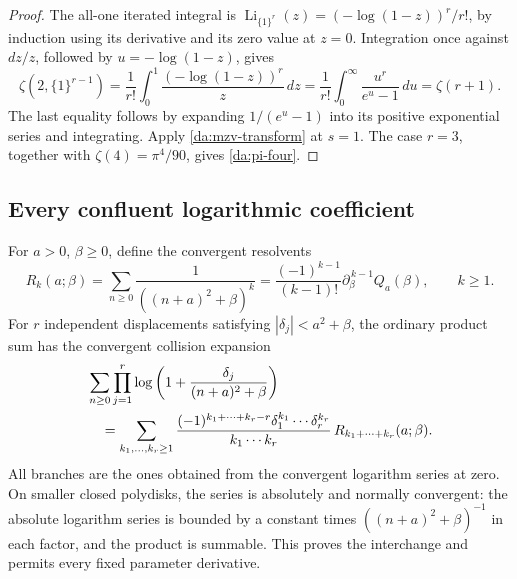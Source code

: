 \documentclass[11pt,letterpaper]{article}
\numberwithin{equation}{section}
\theoremstyle{definition}
\theoremstyle{remark}
\DeclareMathOperator{\Li}{Li}
\newcommand{\dd}{\,d}
\newcommand{\one}[1]{\{1\}^{#1}}
\begin{document}
\begin{proof}
The all-one iterated integral is
\(\Li_{\one r}(z)=(-\log(1-z))^r/r!\), by induction using its
derivative and its zero value at \(z=0\). Integration once against
\(dz/z\), followed by \(u=-\log(1-z)\), gives
\[
 \zeta(2,\one{r-1})
  =\frac1{r!}\int_0^1\frac{(-\log(1-z))^r}{z}\dd z
  =\frac1{r!}\int_0^\infty\frac{u^r}{e^u-1}\dd u
  =\zeta(r+1).
\]
The last equality follows by expanding \(1/(e^u-1)\) into its
positive exponential series and integrating. Apply
\eqref{da:mzv-transform} at \(s=1\). The case \(r=3\), together with
\(\zeta(4)=\pi^4/90\), gives \eqref{da:pi-four}.
\end{proof}

\subsection{Every confluent logarithmic coefficient}

For \(a>0\), \(\beta\ge0\), define the convergent resolvents
\[
 R_k(a;\beta)=\sum_{n\ge0}\frac1{((n+a)^2+\beta)^k}
   =\frac{(-1)^{k-1}}{(k-1)!}\partial_\beta^{\,k-1}Q_a(\beta),
 \qquad k\ge1.
\]
For \(r\) independent displacements satisfying
\(|\delta_j|<a^2+\beta\), the ordinary product sum has the convergent
collision expansion
\begin{align}
 &\sum_{n\ge0}\prod_{j=1}^r
     \log\left(1+\frac{\delta_j}{(n+a)^2+\beta}\right)\notag\\
 &\quad=
 \sum_{k_1,\ldots,k_r\ge1}
   \frac{(-1)^{k_1+\cdots+k_r-r}
             \delta_1^{k_1}\cdots\delta_r^{k_r}}
        {k_1\cdots k_r}\,
       R_{k_1+\cdots+k_r}(a;\beta).
 \label{da:independent-collision}
\end{align}
All branches are the ones obtained from the convergent logarithm series
at zero. On smaller closed polydisks, the series is absolutely and normally
convergent: the absolute logarithm series is bounded by a constant times
\(((n+a)^2+\beta)^{-1}\) in each factor, and the product is summable.
This proves the interchange and permits every fixed parameter derivative.
\end{document}
